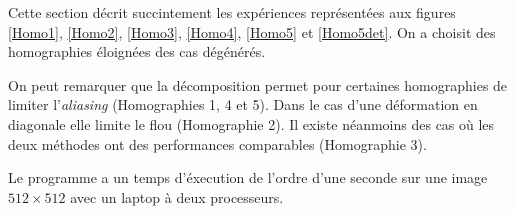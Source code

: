 

Cette section décrit succintement les expériences représentées aux figures \ref{Homo1}, \ref{Homo2}, \ref{Homo3}, \ref{Homo4}, \ref{Homo5} et \ref{Homo5det}. On a choisit des homographies éloignées des cas dégénérés.

On peut remarquer que la décomposition permet pour certaines homographies de limiter l'\emph{aliasing} (Homographies 1, 4 et 5). Dans le cas d'une déformation en diagonale elle limite le flou (Homographie 2). Il existe néanmoins des cas où les deux méthodes ont des performances comparables (Homographie 3).

Le programme a un temps d'éxecution de l'ordre d'une seconde sur une image $512\times 512$ avec un laptop à deux processeurs.

